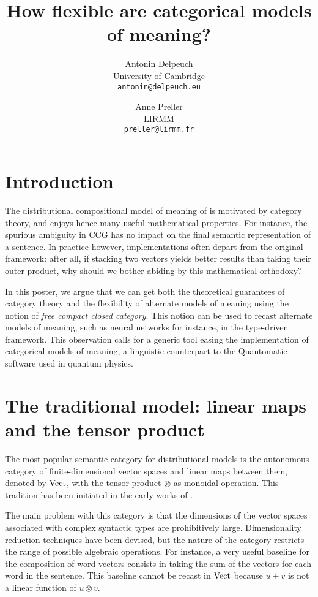 \documentclass[a4paper,11pt]{article}
\title{How flexible are categorical models of meaning?}
\date{}
\author{
    Antonin Delpeuch \\
    University of Cambridge \\
    \texttt{antonin@delpeuch.eu}
    \and
    Anne Preller \\
    LIRMM \\
    \texttt{preller@lirmm.fr}
}
\begin{document}
\maketitle

\section{Introduction}

The distributional compositional model of meaning of \cite{clark2008compositional}
is motivated by category theory, and enjoys hence many useful mathematical properties. For instance,
the spurious ambiguity in CCG has no impact on the final semantic representation of a sentence.
In practice however, implementations often depart from the original framework: after all, if
stacking two vectors yields better results than taking their outer product, why should
we bother abiding by this mathematical orthodoxy?

In this poster, we argue that we can get both the theoretical guarantees
of category theory and the flexibility of alternate models of meaning using
the notion of \emph{free compact closed category}.
This notion can be used to recast alternate models of meaning, such as neural networks
for instance, in the type-driven framework.
This observation calls for a generic tool easing the implementation of categorical
models of meaning, a linguistic counterpart to the Quantomatic software used
in quantum physics.


\section{The traditional model: linear maps and the tensor product}

The most popular semantic category for distributional models is the
autonomous category of finite-dimensional vector spaces and linear maps
between them, denoted by $\operatorname{Vect}$, with the tensor product $\otimes$ as
monoidal operation.  This
tradition has been initiated in the early works of
\cite{clark2007combining,clark2008compositional,coecke2010mathematical}.

The main problem with this category is that the dimensions of the vector
spaces associated with complex syntactic types are prohibitively large.
Dimensionality reduction techniques have been devised, but the nature of
the category restricts the range of possible algebraic operations. For
instance, a very useful baseline for the composition of word vectors
consists in taking the sum of the vectors for each word in the sentence.
This baseline cannot be recast in $\operatorname{Vect}$
because $u + v$ is not a linear function of $u \otimes v$.
\end{document}
